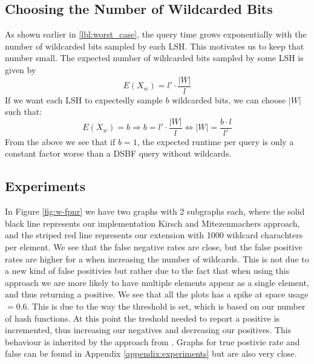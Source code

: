 \documentclass[a4paper,11pt]{article}
\begin{document}
\subsection{Choosing the Number of Wildcarded Bits}
As shown earlier in \ref{lbl:worst_case}, the query time grows exponentially with the number of wildcarded bits sampled by each LSH. This motivates us to keep that number small. The expected number of wildcarded bits sampled by some LSH is given by
\[E(X_w)=l' \cdot \frac{|W|}{l}\]
If we want each LSH to expectedly sample $b$ wildcarded bits, we can choose $|W|$ such that:
\[E(X_w)=b \Rightarrow b = l' \cdot \frac{|W|}{l} \Leftrightarrow |W| = \frac{b \cdot l}{l'}\]
From the above we see that if $b = 1$, the expected runtime per query is only a constant factor worse than a DSBF query without wildcards.


\subsection{Experiments}
In Figure \ref{fig:w-fpnr} we have two graphs with 2 subgraphs each, where the solid black line represents our implementation Kirsch and Mitezenmachers approach, and the striped red line represents our extension with 1000 wildcard charachters per element. We see that the false negative rates are close, but the false positive rates are higher for a when increasing the number of wildcards. This is not due to a new kind of false positivies but rather due to the fact that when using this approach we are more likely to have multiple elements appear as a single element, and thus returning a positive. We see that all the plots has a spike at space usage $= 0.6$. This is due to the way the threshold is set, which is based on our number of hash functions. At this point the treshold needed to report a positive is incremented, thus increasing our negatives and decreasing our positives. This behaviour is inherited by the approach from \cite{paper:harvard}. Graphs for true postivie rate and false can be found in Appendix \ref{appendix:experiments} but are also very close.
\end{document}
